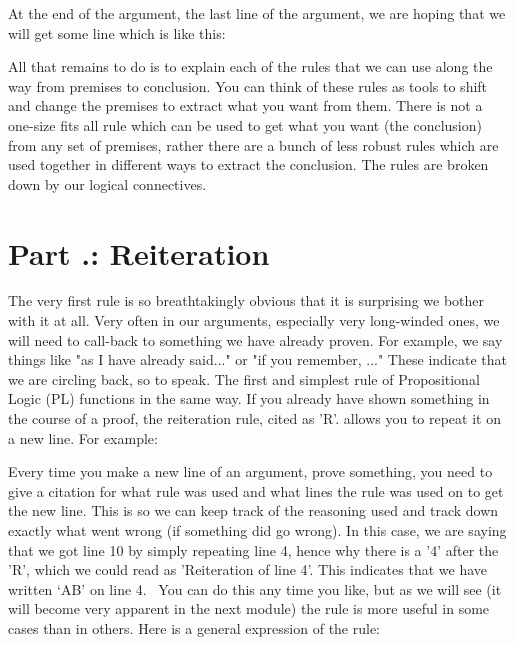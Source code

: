 At the end of the argument, the last line of the argument, we are hoping that we will get some line which is like this:

\begin{fitchproof}
\end{fitchproof}

All that remains to do is to explain each of the rules that we can use along the way from premises to conclusion. You can think of these rules as tools to shift and change the premises to extract what you want from them. There is not a one-size fits all rule which can be used to get what you want (the conclusion) from any set of premises, rather there are a bunch of less robust rules which are used together in different ways to extract the conclusion. The rules are broken down by our logical connectives.
\section{Part \thechapcount.\theseccount: Reiteration}
The very first rule is so breathtakingly obvious that it is surprising we bother with it at all. Very often in our arguments, especially very long-winded ones, we will need to call-back to something we have already proven. For example, we say things like "as I have already said..." or "if you remember, ..." These indicate that we are circling back, so to speak. The first and simplest rule of Propositional Logic (PL) functions in the same way. If you already have shown something in the course of a proof, the reiteration rule, cited as 'R'. allows you to repeat it on a new line. For example:

\begin{fitchproof}
\ellipsesline
{} 
\end{fitchproof}

Every time you make a new line of an argument, prove something, you need to give a citation for what rule was used and what lines the rule was used on to get the new line. This is so we can keep track of the reasoning used and track down exactly what went wrong (if something did go wrong). In this case, we are saying that we got line 10 by simply repeating line 4, hence why there is a '4' after the 'R', which we could read as 'Reiteration of line 4'. This indicates that we have written ‘A\eand B’ on line 4.  You can do this any time you like, but as we will see (it will become very apparent in the next module) the rule is more useful in some cases than in others. Here is a general expression of the rule:

